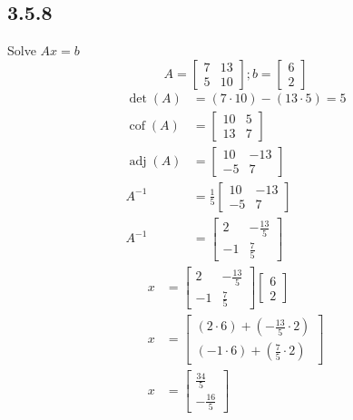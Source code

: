 \documentclass{article}
\DeclareMathOperator{\cof}{cof}
\DeclareMathOperator{\adj}{adj}
\begin{document}
\subsection{3.5.8}
Solve $ Ax = b $
\begin{equation*}
	A =
		\begin{bmatrix}
			7 & 13 \\
			5 & 10
		\end{bmatrix};
	b =
		\begin{bmatrix}
			6 \\
			2
		\end{bmatrix}
\end{equation*}
\begin{align*}
	\det(A) & = (7 \cdot 10) - (13 \cdot 5) = 5 \\
	\cof(A) & =
		\begin{bmatrix}
			10 & 5 \\
			13 & 7
		\end{bmatrix} \\
	\adj(A) & =
		\begin{bmatrix}
			10 & -13 \\
			-5 & 7
		\end{bmatrix} \\
	A^{-1} & = \frac{1}{5}
		\begin{bmatrix}
			10 & -13 \\
			-5 & 7
		\end{bmatrix} \\
	A^{-1} & =
		\begin{bmatrix}
			2 & -\frac{13}{5} \\
			-1 & \frac{7}{5}
		\end{bmatrix}
\end{align*}
\begin{align*}
	x & =
		\begin{bmatrix}
			2 & -\frac{13}{5} \\
			-1 & \frac{7}{5}
		\end{bmatrix}
		\begin{bmatrix}
			6 \\
			2
		\end{bmatrix} \\
	x & =
		\begin{bmatrix}
			(2 \cdot 6) + (-\frac{13}{5} \cdot 2) \\
			(-1 \cdot 6) + (\frac{7}{5} \cdot 2)
		\end{bmatrix} \\
	x & =
		\begin{bmatrix}
			\frac{34}{5} \\
			-\frac{16}{5}
		\end{bmatrix}
\end{align*}
\end{document}

